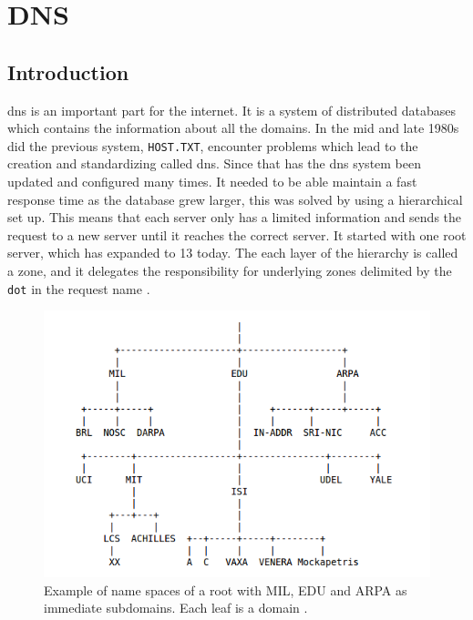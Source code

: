 \chapter{DNS}
\label{chp:dns}

\section{Introduction}

\Gls{dns} is an important part for the internet. It is a system of distributed databases which contains the information about all the domains. In the mid and late 1980s did the previous system, \texttt{HOST.TXT}, encounter problems \cite{Mockapetris:1988:DDN:52324.52338} which lead to the creation and standardizing called \Gls{dns}. Since that has the \Gls{dns} system been updated and configured many times. It needed to be able maintain a fast response time as the database grew larger, this was solved by using a hierarchical set up. This means that each server only has a limited information and sends the request to a new server until it reaches the correct server. It started with one root server, which has expanded to 13 today. The each layer of the hierarchy is called a zone, and it delegates the responsibility for underlying zones delimited by the \texttt{dot} in the request name .

\begin{figure}
\centering
\includegraphics[scale=0.5]{figs/namespace_example.png}
\caption{\label{fig:namespace}Example of name spaces of a root with MIL, EDU and ARPA as immediate subdomains. Each leaf is a domain \citep{mockapetris1987domain}.}
\end{figure}



